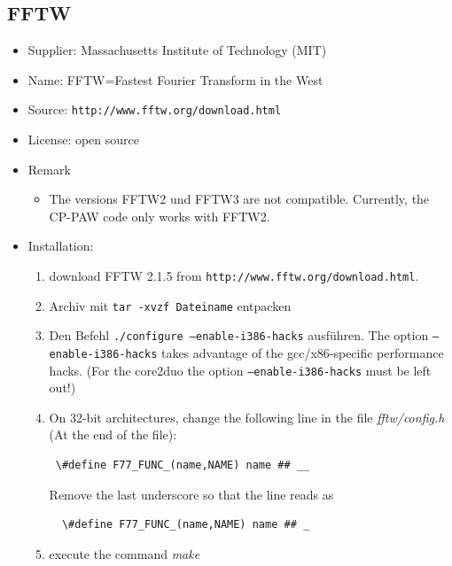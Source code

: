 \documentclass[a4paper,10pt]{report}
\newcommand{\mytt}[1]{{\tt #1}}
\begin{document}
\subsection{FFTW}
\label{sec:FFTWinstall}
\begin{itemize}
\item Supplier: Massachusetts Institute of Technology (MIT)
\item Name: FFTW=Fastest Fourier Transform in the West
\item Source: \mytt{http://www.fftw.org/download.html}
\item License: open source
\item Remark
\begin{itemize}
\item The versions FFTW2 und FFTW3 are not compatible. 
Currently, the CP-PAW code only works with FFTW2.
\end{itemize}
\item Installation: 
\begin{enumerate}
\item download FFTW 2.1.5 from \mytt{http://www.fftw.org/download.html}.
\item Archiv mit \mytt{tar -xvzf Dateiname} entpacken
 \item Den Befehl \mytt{./configure --enable-i386-hacks} ausf\"uhren.
 The option \mytt{--enable-i386-hacks} takes advantage of the
 gcc/x86-specific performance hacks. (For the core2duo the option
 \mytt{--enable-i386-hacks} must be left out!)
\item On 32-bit architectures, change the following 
line in the file \textit{fftw/config.h} (At the end of the file):\\
\begin{verbatim}
 \#define F77_FUNC_(name,NAME) name ## __
\end{verbatim}
 Remove the last underscore so that the line reads as
\begin{verbatim}
  \#define F77_FUNC_(name,NAME) name ## _ 
\end{verbatim}
 \item  execute the command \textit{make}
\end{enumerate}
\end{itemize}


\end{document}
